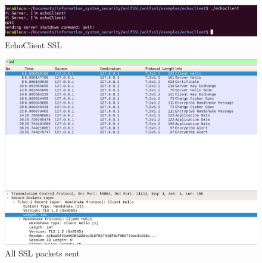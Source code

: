 \documentclass[a4paper,12pt]{report}
\begin{document}
\begin{figure}[H]
\hspace*{-1cm}     
    \centering
    \includegraphics[scale=0.25]{test/examples/echoclient-echoserver/echoClient.png}
    \caption{EchoClient SSL}
    \label{fig:galaxy}
\end{figure}

\begin{figure}[H]
\hspace*{-2cm}     
    \centering
    \includegraphics[scale=0.3]{test/examples/echoclient-echoserver/wireshark.png}
    \caption{All SSL packets sent}
    \label{fig:galaxy}
\end{figure}
\end{document}
